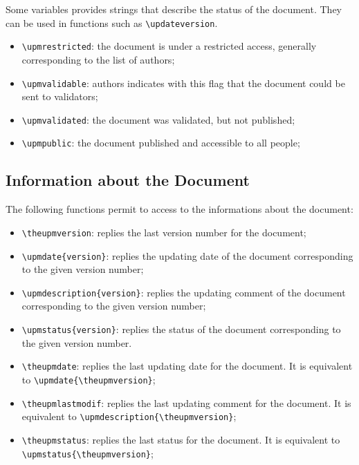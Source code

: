 \documentclass[book]{upmethodology-document}
\begin{document}
Some \LaTeXe\xspace variables provides strings that describe the status of the document. They can be used in functions such as \texttt{{\textbackslash}updateversion}.
\begin{itemize}
\item \texttt{{\textbackslash}upmrestricted}: the document is under a restricted access, generally corresponding to the list of authors;
\item \texttt{{\textbackslash}upmvalidable}: authors indicates with this flag that the document could be sent to validators;
\item \texttt{{\textbackslash}upmvalidated}: the document was validated, but not published;
\item \texttt{{\textbackslash}upmpublic}: the document published and accessible to all people;
\end{itemize}

\subsection{Information about the Document}

The following functions permit to access to the informations about the document:
\begin{itemize}
\item \texttt{{\textbackslash}theupmversion}: replies the last version number for the document;

\item \texttt{{\textbackslash}upmdate\{version\}}: replies the updating date of the document corresponding to the given version number;

\item \texttt{{\textbackslash}upmdescription\{version\}}: replies the updating comment of the document corresponding to the given version number;

\item \texttt{{\textbackslash}upmstatus\{version\}}: replies the status of the document corresponding to the given version number.

\item \texttt{{\textbackslash}theupmdate}: replies the last updating date for the document. It is equivalent to \texttt{{\textbackslash}upmdate\{{\textbackslash}theupmversion\}};

\item \texttt{{\textbackslash}theupmlastmodif}: replies the last updating comment for the document. It is equivalent to \texttt{{\textbackslash}upmdescription\{{\textbackslash}theupmversion\}};

\item \texttt{{\textbackslash}theupmstatus}: replies the last status for the document. It is equivalent to \texttt{{\textbackslash}upmstatus\{{\textbackslash}theupmversion\}};
\end{itemize}
\end{document}
